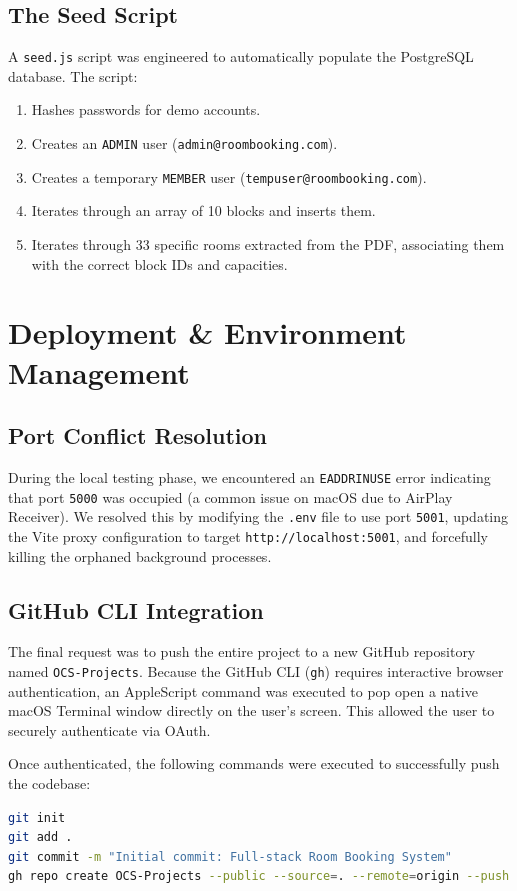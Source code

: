 \documentclass[12pt, a4paper]{report}
\begin{document}
\section{The Seed Script}
A \texttt{seed.js} script was engineered to automatically populate the PostgreSQL database. The script:
\begin{enumerate}
    \item Hashes passwords for demo accounts.
    \item Creates an \texttt{ADMIN} user (\texttt{admin@roombooking.com}).
    \item Creates a temporary \texttt{MEMBER} user (\texttt{tempuser@roombooking.com}).
    \item Iterates through an array of 10 blocks and inserts them.
    \item Iterates through 33 specific rooms extracted from the PDF, associating them with the correct block IDs and capacities.
\end{enumerate}

\chapter{Deployment \& Environment Management}

\section{Port Conflict Resolution}
During the local testing phase, we encountered an \texttt{EADDRINUSE} error indicating that port \texttt{5000} was occupied (a common issue on macOS due to AirPlay Receiver). We resolved this by modifying the \texttt{.env} file to use port \texttt{5001}, updating the Vite proxy configuration to target \texttt{http://localhost:5001}, and forcefully killing the orphaned background processes.

\section{GitHub CLI Integration}
The final request was to push the entire project to a new GitHub repository named \texttt{OCS-Projects}. Because the GitHub CLI (\texttt{gh}) requires interactive browser authentication, an AppleScript command was executed to pop open a native macOS Terminal window directly on the user's screen. This allowed the user to securely authenticate via OAuth. 

Once authenticated, the following commands were executed to successfully push the codebase:
\begin{lstlisting}[language=bash]
git init
git add .
git commit -m "Initial commit: Full-stack Room Booking System"
gh repo create OCS-Projects --public --source=. --remote=origin --push
\end{lstlisting}
\end{document}
